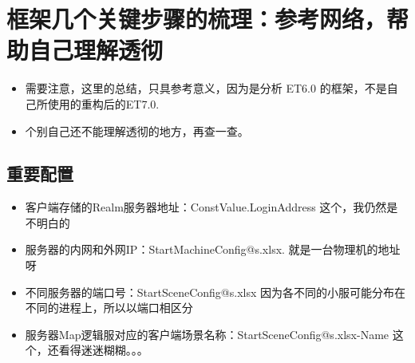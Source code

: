 \documentclass[9pt, b5paper]{article}
\begin{document}
\section{框架几个关键步骤的梳理：参考网络，帮助自己理解透彻}
\label{sec-4}
\begin{itemize}
\item 需要注意，这里的总结，只具参考意义，因为是分析 ET6.0 的框架，不是自己所使用的重构后的ET7.0.
\item 个别自己还不能理解透彻的地方，再查一查。
\end{itemize}
\subsection{重要配置}
\label{sec-4-1}
\begin{itemize}
\item 客户端存储的Realm服务器地址：ConstValue.LoginAddress  这个，我仍然是不明白的
\item 服务器的内网和外网IP：StartMachineConfig@s.xlsx. 就是一台物理机的地址呀
\item 不同服务器的端口号：StartSceneConfig@s.xlsx 因为各不同的小服可能分布在不同的进程上，所以以端口相区分
\item 服务器Map逻辑服对应的客户端场景名称：StartSceneConfig@s.xlsx-Name 这个，还看得迷迷糊糊。。。
\end{itemize}
\end{document}
